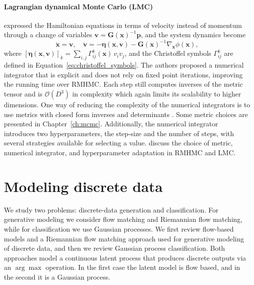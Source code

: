 \paragraph{Lagrangian dynamical Monte Carlo (LMC) }
\citet{Lan2015} expressed the Hamiltonian equations in terms of velocity instead of momentum through a change of variables  $\boldsymbol{v}=\mathbf{G}(\boldsymbol{x})^{-1}\boldsymbol{p}$, and the system dynamics become
\begin{equation}
    \dot{\boldsymbol{x}} = \boldsymbol{v},
    \quad
    \dot{\boldsymbol{v}} = -\boldsymbol{\eta}(\boldsymbol{x},\boldsymbol{v}) - \mathbf{G}(\boldsymbol{x})^{-1}\nabla_{\boldsymbol{x}}\phi(\boldsymbol{x}),
    \label{eqsLMC}
\end{equation}
where $[\boldsymbol{\eta}(\boldsymbol{x},\boldsymbol{v})]_k=\sum_{i,j}\Gamma^k_{ij}(\boldsymbol{x})\,v_i v_j$, and the Christoffel symbols $\Gamma_{ij}^k$ are defined in Equation~\ref{eq:christoffel_symbols}. 
The authors proposed a numerical integrator that is explicit and does not rely on fixed point iterations, improving the running time over RMHMC. Each step still computes inverses of the metric tensor and is $\mathcal{O}(D^3)$ in complexity which again limits its scalability to higher dimensions. One way of reducing the complexity of the numerical integrators is to use metrics with closed form inverses and determinants \citep{Hartmann2022}. Some metric choices are presented in Chapter~\ref{ch:mcmc}.
Additionally, the numerical integrator introduces two hyperparameters, the step-size and the number of steps, with several strategies available for selecting a value. \citet{williams2024geometric} discuss the choice of metric, numerical integrator, and hyperparameter adaptation in RMHMC and LMC. 

\section{Modeling discrete data} \label{sec:discrete_data}

We study two problems: discrete-data generation and classification. For generative modeling we consider flow matching and Riemannian flow matching, while for classification we use Gaussian processes. 
We first review flow-based models and a Riemannian flow matching approach used for generative modeling of discrete data, and then we review Gaussian process classification. Both approaches model a continuous latent process that produces discrete outputs via an $\arg\max$ operation. In the first case the latent model is flow based, and in the second it is a Gaussian process.  

